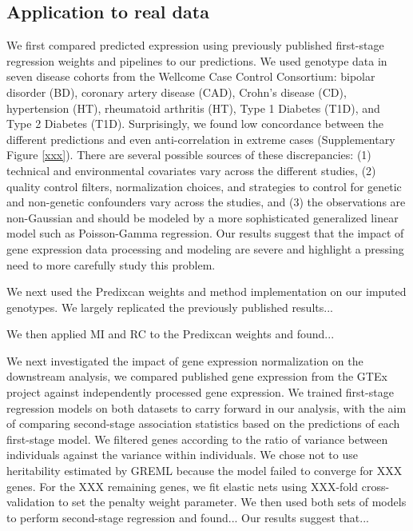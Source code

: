 \documentclass{article}
\begin{document}
\subsection{Application to real data}

We first compared predicted expression using previously published first-stage
regression weights and pipelines to our
predictions\cite{10.1038/ng.3367,10.1038/ng.3506}. We used genotype data in
seven disease cohorts from the Wellcome Case Control
Consortium\cite{10.1038/nature05911}: bipolar disorder (BD), coronary artery
disease (CAD), Crohn's disease (CD), hypertension (HT), rheumatoid arthritis
(HT), Type 1 Diabetes (T1D), and Type 2 Diabetes (T1D). Surprisingly, we found
low concordance between the different predictions and even anti-correlation in
extreme cases (Supplementary Figure \ref{xxx}). There are several possible
sources of these discrepancies: (1) technical and environmental covariates vary
across the different studies, (2) quality control filters, normalization
choices, and strategies to control for genetic and non-genetic confounders vary
across the studies, and (3) the observations are non-Gaussian and should be
modeled by a more sophisticated generalized linear model such as Poisson-Gamma
regression. Our results suggest that the impact of gene expression data
processing and modeling are severe and highlight a pressing need to more
carefully study this problem.

We next used the Predixcan weights and method implementation on our imputed
genotypes. We largely replicated the previously published results...

We then applied MI and RC to the Predixcan weights and found...

We next investigated the impact of gene expression normalization on the
downstream analysis, we compared published gene expression from the GTEx
project against independently processed gene expression. We trained first-stage
regression models on both datasets to carry forward in our analysis, with the
aim of comparing second-stage association statistics based on the predictions
of each first-stage model. We filtered genes according to the ratio of variance
between individuals against the variance within individuals. We chose not to
use heritability estimated by GREML\cite{10.1016/j.ajhg.2010.11.011} because
the model failed to converge for XXX genes. For the XXX remaining genes, we fit
elastic nets using XXX-fold cross-validation to set the penalty weight
parameter. We then used both sets of models to perform second-stage regression
and found... Our results suggest that...
\end{document}
